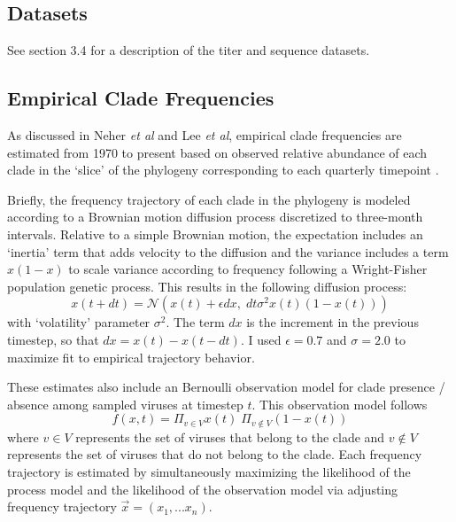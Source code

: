 \subsection*{Datasets}
See section 3.4 for a description of the titer and sequence datasets.

\subsection*{Empirical Clade Frequencies}
As discussed in Neher \textit{et al} and Lee \textit{et al}, empirical clade frequencies are estimated from 1970 to present based on observed relative abundance of each clade in the `slice' of the phylogeny corresponding to each quarterly timepoint \citep{lee2018deep,neher2016prediction}.

Briefly, the frequency trajectory of each clade in the phylogeny is modeled according to a Brownian motion diffusion process discretized to three-month intervals.
Relative to a simple Brownian motion, the expectation includes an `inertia' term that adds velocity to the diffusion and the variance includes a term $x(1-x)$ to scale variance according to frequency following a Wright-Fisher population genetic process.
This results in the following diffusion process:
\begin{equation}
  \label{eq_estimate_frequency}
x(t+dt) = \mathcal{N}\left(x(t) + \epsilon dx, \; dt \sigma^2 x(t) (1-x(t))\right)
\end{equation}
\noindent
with `volatility' parameter $\sigma^2$.
The term $dx$ is the increment in the previous timestep, so that $dx = x(t) - x(t-dt)$.
I used $\epsilon = 0.7$ and $\sigma = 2.0$ to maximize fit to empirical trajectory behavior.

These estimates also include an Bernoulli observation model for clade presence / absence among sampled viruses at timestep $t$.
This observation model follows
\begin{equation}
f(x,t) = \Pi_{v \in V} x(t) \; \Pi_{v \notin V} (1-x(t))
\end{equation}
where $v \in V$ represents the set of viruses that belong to the clade and $v \notin V$ represents the set of viruses that do not belong to the clade.
Each frequency trajectory is estimated by simultaneously maximizing the likelihood of the process model and the likelihood of the observation model via adjusting frequency trajectory $\vec{x} = (x_1, ... x_n)$.

